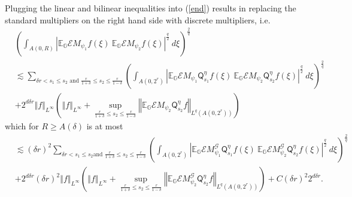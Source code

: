 \documentclass{amsart}%
\theoremstyle{plain}
\numberwithin{equation}{section}
\begin{document}
Plugging the linear and bilinear inequalities into (\ref{end}) results in
replacing the standard multipliers on the right hand side with discrete
multipliers, i.e.%
\begin{align*}
& \left(  \int_{A\left(  0,R\right)  }\left\vert \mathbb{E}_{\mathbb{G}%
}\mathcal{E}M_{\psi_{1}}f\left(  \xi\right)  \ \mathbb{E}_{\mathbb{G}%
}\mathcal{E}M_{\psi_{2}}f\left(  \xi\right)  \right\vert ^{\frac{q}{2}}%
\ d\xi\right)  ^{\frac{2}{q}}\\
& \lesssim\sum_{\delta r<s_{1}\leq s_{2}\text{ and }\frac{r}{1+\delta}\leq
s_{2}\leq\frac{r}{1-\delta}}\left(  \int_{A\left(  0,2^{r}\right)  }\left\vert
\mathbb{E}_{\mathbb{G}}\mathcal{E}M_{\psi_{1}}\mathsf{Q}_{s_{1}}^{\eta
}f\left(  \xi\right)  \ \mathbb{E}_{\mathbb{G}}\mathcal{E}M_{\psi_{2}%
}\mathsf{Q}_{s_{2}}^{\eta}f\left(  \xi\right)  \right\vert ^{\frac{q}{2}%
}\ d\xi\right)  ^{\frac{2}{q}}\\
& +2^{d\delta r}\left\Vert f\right\Vert _{L^{\infty}}\left(  \left\Vert
f\right\Vert _{L^{\infty}}+\sup_{\frac{r}{1+\delta}\leq s_{2}\leq\frac
{r}{1-\delta}}\left\Vert \mathbb{E}_{\mathbb{G}}\mathcal{E}M_{\psi_{2}%
}\mathsf{Q}_{s_{2}}^{\eta}f\right\Vert _{L^{q}\left(  A\left(  0,2^{r}\right)
\right)  }\right)
\end{align*}
which for $R\geq A\left(  \delta\right)  $ is at most%
\begin{align*}
& \lesssim\left(  \delta r\right)  ^{2}\sum_{\delta r<s_{1}\leq s_{2}\text{
and }\frac{r}{1+\delta}\leq s_{2}\leq\frac{r}{1-\delta}}\left(  \int_{A\left(
0,2^{r}\right)  }\left\vert \mathbb{E}_{\mathbb{G}}\mathcal{E}M_{\psi_{1}%
}^{\mathcal{G}}\mathsf{Q}_{s_{1}}^{\eta}f\left(  \xi\right)  \ \mathbb{E}%
_{\mathbb{G}}\mathcal{E}M_{\psi_{2}}^{\mathcal{G}}\mathsf{Q}_{s_{2}}^{\eta
}f\left(  \xi\right)  \right\vert ^{\frac{q}{2}}\ d\xi\right)  ^{\frac{2}{q}%
}\\
& +2^{d\delta r}\left(  \delta r\right)  ^{2}\left\Vert f\right\Vert
_{L^{\infty}}\left(  \left\Vert f\right\Vert _{L^{\infty}}+\sup_{\frac
{r}{1+\delta}\leq s_{2}\leq\frac{r}{1-\delta}}\left\Vert \mathbb{E}%
_{\mathbb{G}}\mathcal{E}M_{\psi_{2}}^{\mathcal{G}}\mathsf{Q}_{s_{2}}^{\eta
}f\right\Vert _{L^{q}\left(  A\left(  0,2^{r}\right)  \right)  }\right)
+C\left(  \delta r\right)  ^{2}2^{d\delta r}.
\end{align*}
\end{document}
